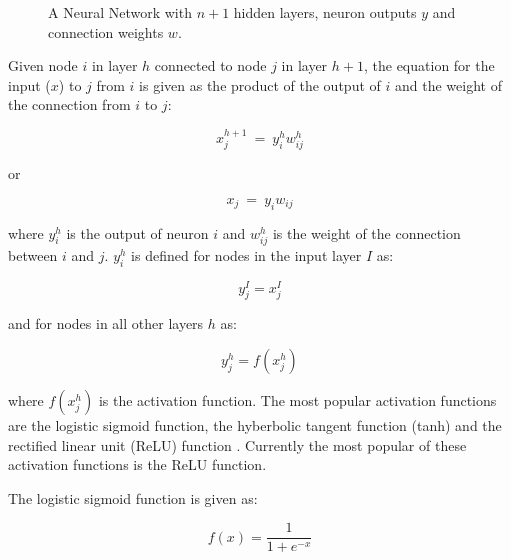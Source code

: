 \documentclass{IEEEtran}
\begin{document}
\begin{figure}
\centering

\caption{A Neural Network with $n + 1$ hidden layers, neuron outputs $y$ and connection weights $w$.}
\label{fig_sim}
\end{figure}


Given node $i$ in layer $h$ connected to node $j$ in layer $h+1$, the equation for the input ($x$) to $j$ from $i$ is given as the product of the output of $i$ and the weight of the connection from $i$ to $j$:


\begin{equation}
\label{eqn_nn_nodeinput}
 x^{h+1}_{j} \ = \ y^h_i w^h_{ij}
\end{equation}

or

\begin{equation}
\label{eqn_nn_nodeinput2}
 x_{j} \ = \ y_i w_{ij}
\end{equation}

where $y^h_i$ is the output of neuron $i$ and $w^h_{ij}$ is the weight of the connection between $i$ and $j$. $y^h_i$ is defined for nodes in the input layer $I$ as:

\begin{equation}
\label{eqn_nn_inodeoutput}
 y_j^I = x_j^I
\end{equation}

and for nodes in all other layers $h$ as:

\begin{equation}
\label{eqn_nn_hnodeoutput}
y^h_j = f(x_j^h)
\end{equation}

where $f(x_j^h)$ is the activation function. The most popular activation functions are the logistic sigmoid function, the hyberbolic tangent function (tanh) and the rectified
linear unit (ReLU) function \cite{lecun2015deep}. Currently the most popular of these activation functions is the ReLU function\cite{lecun2015deep}.

The logistic sigmoid function is given as:

\begin{equation}
\label{eqn_nn_sigmoid}
f(x) = \frac{1}{1 + e^{-x}}
\end{equation}
\end{document}
